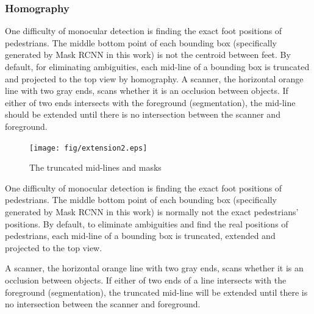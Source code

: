 \documentclass[journal]{IEEEtran}
\begin{document}
\subsubsection{Homography}

One difficulty of monocular detection is finding the exact foot positions of pedestrians. The middle bottom point of each bounding box (specifically generated by Mask RCNN in this work) is not the centroid between feet. By default, for eliminating ambiguities, each mid-line of a bounding box is truncated and projected to the top view by homography.
A scanner, the horizontal orange line with two gray ends, scans whether it is an occlusion between objects. If either of two ends intersects with the foreground (segmentation), the mid-line should be extended until there is no intersection between the scanner and foreground.

\begin{figure}[!t]
\centering
\texttt{[image: fig/extension2.eps]}
\label{fig_first_case}

\caption{The truncated mid-lines and masks} \label{fig_sim}
\end{figure}


One difficulty of monocular detection is finding the exact foot positions of pedestrians. The middle bottom point of each bounding box (specifically generated by Mask RCNN in this work) is normally not the exact pedestrians' positions. By default, to eliminate ambiguities and find the real positions of pedestrians, each mid-line of a bounding box is truncated, extended and projected to the top view.

A scanner, the horizontal orange line with two gray ends, scans whether it is an occlusion between objects. If either of two ends of a line intersects with the foreground (segmentation), the truncated mid-line will be extended until there is no intersection between the scanner and foreground.

\end{document}

